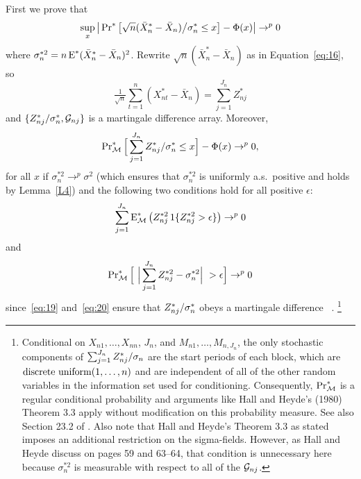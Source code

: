 \documentclass[11pt]{article}
\begin{document}
{%
\newcommand{\Db}[1][j]{D_{n#1}^{*}}
\newcommand{\Zsum}{\sum_{j=1}^{J_n} \Zb / \sigma_n}

First we prove that
\begin{equation}\label{eq:37}
  \sup_x \big\lvert \operatorname{Pr}^{*}\big[
  \sqrt{n}(\bar X_{n}^{*} -  \bar X_n) \big/ \sigma_n^{*}
  \leq x \big] - \Phi(x) \big\rvert \to^p 0
\end{equation}
where $\sigma_n^{*2} = n \operatorname{E}^* (\bar X_n^* - \bar X_n)^2$.
Rewrite $\sqrt{n}(\bar X_{n}^{*} - \bar X_n)$ as in
Equation~\eqref{eq:16}, so
\begin{equation*}
  \tfrac{1}{\sqrt{n}} \sum_{t=1}^n (X_{nt}^* - \bar X_n) =
  \sum_{j=1}^{J_n} Z_{nj}^*
\end{equation*}
and $\{{Z^*_{n{j}}} / \sigma_n^*, \mathcal{G}_{nj}\}$ is a martingale difference
array. Moreover,
\begin{equation}
  \label{eq:18}
  \operatorname{Pr}_{\mathcal{M}}^{*} \Big[\sum_{j=1}^{J_n} {Z^*_{n{j}}} / \sigma_n^* \leq x \Big] - \Phi(x) \to^p 0,
\end{equation}
for all $x$ if $\sigma_n^{*2} \to^p \sigma^2$ (which ensures that
$\sigma_n^{*2}$ is uniformly a.s.\ positive and holds by
Lemma~\ref{L4}) and the following
two conditions hold for all positive $\epsilon$:
\begin{equation}
  \label{eq:19}
  \sum_{j=1}^{J_n} \operatorname{E}_{\mathcal{M}}^{*} \big(Z_{nj}^{*2} \operatorname{1}\{Z_{nj}^{*2}  >
  \epsilon\}\big) \to^p 0
\end{equation}
and
\begin{equation}
  \label{eq:20}
  \operatorname{Pr}_{\mathcal{M}}^{*}\Big[\ \Big|\sum_{j=1}^{J_n} Z_{nj}^{*2} - \sigma_n^{*2}
  \Big|\ > \epsilon \Big] \to^p 0
\end{equation}
since~\eqref{eq:19} and~\eqref{eq:20} ensure that ${Z^*_{n{j}}}/\sigma_n^*$ obeys
a martingale difference \clt\ \citep[e.g.][Theorem 3.3]{HaH:80}.%
\footnote{Conditional on $X_{n1},\dots,X_{nn}$, $J_n$, and
  $M_{n1},\dots,M_{n,J_n}$, the only stochastic components of $\Zsum$
  are the start periods of each block, which are
  $\operatorname{discrete\ uniform}(1,\dots,n)$ and are independent of all of the
  other random variables in the information set used for conditioning.
  Consequently, $\operatorname{Pr}_{\mathcal{M}}^*$ is a regular conditional probability and
  arguments like Hall and Heyde's (1980) Theorem 3.3
  apply without modification on this probability measure. See
  also Section 23.2 of \citet{Vaa:00}.
  Also note that Hall and Heyde's Theorem 3.3 as stated imposes an
  additional restriction on the sigma-fields. However, as Hall and
  Heyde discuss on pages 59 and 63--64, that condition is unnecessary
  here because $\sigma_n^{*2}$ is measurable with respect to
  all of the $\mathcal{G}_{nj}$.} %

}
\end{document}
